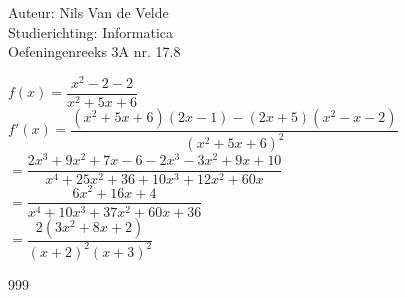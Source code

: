 \documentclass[a4paper]{article}
\begin{document}
  
\noindent \large Auteur: Nils Van de Velde \\
\noindent \large Studierichting: Informatica\\
\noindent \large Oefeningenreeks 3A nr. 17.8\\

\medskip

\normalsize

$f(x) = \dfrac{x^2-2-2}{x^2+5x+6}$\\

$f'(x) =\dfrac{(x^2+5x+6)(2x-1)-(2x+5)(x^2-x-2)}{(x^2+5x+6)^2}$\\

$= \dfrac{2x^3+9x^2+7x-6-2x^3-3x^2+9x+10}{x^4+25x^2+36+10x^3+12x^2+60x}$\\

$= \dfrac{6x^2+16x+4}{x^4+10x^3+37x^2+60x+36}$\\

$= \dfrac{2(3x^2+8x+2)}{(x+2)^2(x+3)^2}$\\

\begin{thebibliography}{999}
\end{thebibliography}
\end{document}
